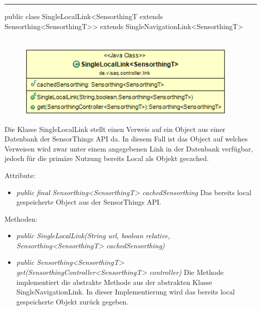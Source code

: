 \rule{\textwidth}{0.4pt}
public class SingleLocalLink<SensorthingT extends Sensorthing<SensorthingT>> extends SingleNavigationLink<SensorthingT>
\\\\
\begin{minipage}{0.4\textwidth}
    \begin{figure}[H]
        {\centering\includegraphics[width=0.95\textwidth]{media/backend/controller/classes/SingleLocalLink.png}}
    \end{figure}
    \end{minipage} \hfill
\begin{minipage}{0.6\textwidth}
    Die Klasse SingleLocalLink stellt einen Verweis auf ein Object aus einer Datenbank der \gls{SensorThings API} da.
    In diesem Fall ist das Object auf welches Verweisen wird zwar unter einem angegebenen Link in der Datenbank verfügbar, jedoch für die primäre Nutzung bereits Local als Objekt gecached.
\end{minipage}

Attribute:
\begin{itemize}
    \item \emph{public final Sensorthing<SensorthingT> cachedSensorthing} Das bereits local gespeicherte Object aus der \gls{SensorThings API}.
\end{itemize}
Methoden:
\begin{itemize}
    \item \emph{public SingleLocalLink(String url, boolean relative, Sensorthing<SensorthingT> cachedSensorthing)}
    \relativeDescription
    \item \emph{public Sensorthing<SensorthingT> get(SensorthingController<SensorthingT> controller)}
    Die Methode implementiert die abstrakte Methode aus der abstrakten Klasse SingleNavigationLink. In dieser Implementierung wird das bereits local gespeicherte Objekt zurück gegeben.
\end{itemize}

